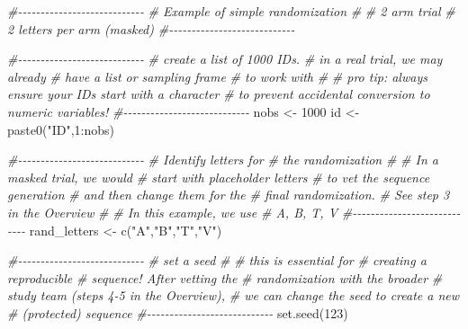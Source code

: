\documentclass[
]{book}
\newenvironment{Shaded}{\begin{snugshade}}{\end{snugshade}}
\newcommand{\CommentTok}[1]{\textcolor[rgb]{0.56,0.35,0.01}{\textit{#1}}}
\newcommand{\DecValTok}[1]{\textcolor[rgb]{0.00,0.00,0.81}{#1}}
\newcommand{\FunctionTok}[1]{\textcolor[rgb]{0.00,0.00,0.00}{#1}}
\newcommand{\NormalTok}[1]{#1}
\newcommand{\OtherTok}[1]{\textcolor[rgb]{0.56,0.35,0.01}{#1}}
\newcommand{\SpecialCharTok}[1]{\textcolor[rgb]{0.00,0.00,0.00}{#1}}
\newcommand{\StringTok}[1]{\textcolor[rgb]{0.31,0.60,0.02}{#1}}
\begin{document}
\begin{Shaded}
\begin{Highlighting}[]
\CommentTok{\#{-}{-}{-}{-}{-}{-}{-}{-}{-}{-}{-}{-}{-}{-}{-}{-}{-}{-}{-}{-}{-}{-}{-}{-}{-}{-}{-}{-}}
\CommentTok{\# Example of simple randomization}
\CommentTok{\#}
\CommentTok{\# 2 arm trial}
\CommentTok{\# 2 letters per arm (masked)}
\CommentTok{\#{-}{-}{-}{-}{-}{-}{-}{-}{-}{-}{-}{-}{-}{-}{-}{-}{-}{-}{-}{-}{-}{-}{-}{-}{-}{-}{-}{-}}

\CommentTok{\#{-}{-}{-}{-}{-}{-}{-}{-}{-}{-}{-}{-}{-}{-}{-}{-}{-}{-}{-}{-}{-}{-}{-}{-}{-}{-}{-}{-}}
\CommentTok{\# create a list of 1000 IDs.}
\CommentTok{\# in a real trial, we may already}
\CommentTok{\# have a list or sampling frame }
\CommentTok{\# to work with }
\CommentTok{\#}
\CommentTok{\# pro tip: always ensure your IDs start with a character}
\CommentTok{\# to prevent accidental conversion to numeric variables!}
\CommentTok{\#{-}{-}{-}{-}{-}{-}{-}{-}{-}{-}{-}{-}{-}{-}{-}{-}{-}{-}{-}{-}{-}{-}{-}{-}{-}{-}{-}{-}}
\NormalTok{nobs }\OtherTok{\textless{}{-}} \DecValTok{1000}
\NormalTok{id }\OtherTok{\textless{}{-}} \FunctionTok{paste0}\NormalTok{(}\StringTok{"ID"}\NormalTok{,}\DecValTok{1}\SpecialCharTok{:}\NormalTok{nobs)}

\CommentTok{\#{-}{-}{-}{-}{-}{-}{-}{-}{-}{-}{-}{-}{-}{-}{-}{-}{-}{-}{-}{-}{-}{-}{-}{-}{-}{-}{-}{-}}
\CommentTok{\# Identify letters for}
\CommentTok{\# the randomization}
\CommentTok{\#}
\CommentTok{\# In a masked trial, we would}
\CommentTok{\# start with placeholder letters}
\CommentTok{\# to vet the sequence generation}
\CommentTok{\# and then change them for the}
\CommentTok{\# final randomization.}
\CommentTok{\# See step 3 in the Overview}
\CommentTok{\#}
\CommentTok{\# In this example, we use}
\CommentTok{\# A, B, T, V}
\CommentTok{\#{-}{-}{-}{-}{-}{-}{-}{-}{-}{-}{-}{-}{-}{-}{-}{-}{-}{-}{-}{-}{-}{-}{-}{-}{-}{-}{-}{-}}
\NormalTok{rand\_letters }\OtherTok{\textless{}{-}} \FunctionTok{c}\NormalTok{(}\StringTok{"A"}\NormalTok{,}\StringTok{"B"}\NormalTok{,}\StringTok{"T"}\NormalTok{,}\StringTok{"V"}\NormalTok{)}

\CommentTok{\#{-}{-}{-}{-}{-}{-}{-}{-}{-}{-}{-}{-}{-}{-}{-}{-}{-}{-}{-}{-}{-}{-}{-}{-}{-}{-}{-}{-}}
\CommentTok{\# set a seed}
\CommentTok{\# }
\CommentTok{\# this is essential for }
\CommentTok{\# creating a reproducible }
\CommentTok{\# sequence!  After vetting the}
\CommentTok{\# randomization with the broader}
\CommentTok{\# study team (steps 4{-}5 in the Overview), }
\CommentTok{\# we can change the seed to create a new}
\CommentTok{\# (protected) sequence}
\CommentTok{\#{-}{-}{-}{-}{-}{-}{-}{-}{-}{-}{-}{-}{-}{-}{-}{-}{-}{-}{-}{-}{-}{-}{-}{-}{-}{-}{-}{-}}
\FunctionTok{set.seed}\NormalTok{(}\DecValTok{123}\NormalTok{)}


\end{Highlighting}
\end{Shaded}
\end{document}
